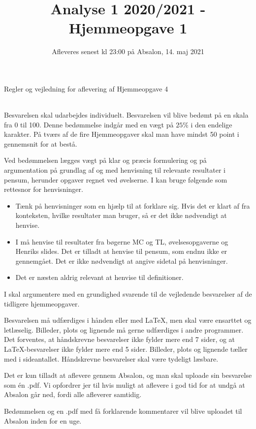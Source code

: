 \documentclass{article}
\title{Analyse 1 2020/2021 - Hjemmeopgave 1}
\author{}
\date{\vspace{-1cm}Afleveres senest kl 23:00 på Absalon, 14. maj 2021}
\begin{document}
	
	\maketitle
	
	\noindent

	
	
	
	\newpage
	\noindent
	{\LARGE Regler og vejledning for aflevering af Hjemmeopgave 4}
	
	\noindent\hrulefill \\
	
	\noindent
	Besvarelsen skal udarbejdes individuelt. Besvarelsen vil blive bedømt på en skala fra 0 til 100. Denne bedømmelse indgår med en vægt på $25\%$ i den endelige karakter. På tværs af de fire Hjemmeopgaver skal man have mindst 50 point i gennemsnit for at bestå.
	
	Ved bedømmelsen lægges vægt på klar og præcis formulering og på argumentation på grundlag af og med henvisning til relevante resultater i pensum, herunder opgaver regnet ved øvelserne. I kan bruge følgende som rettesnor for henvisninger.
	\begin{itemize}
		\item Tænk på henvisninger som en hjælp til at forklare sig. Hvis det er klart af fra konteksten, hvilke resultater man bruger, så er det ikke nødvendigt at henvise.
		
		\item I må henvise til resultater fra bøgerne MC og TL, øvelsesopgaverne og Henriks slides. Det er tilladt at henvise til pensum, som endnu ikke er gennemgået. Det er ikke nødvendigt at angive sidetal på henvisninger. 
		
		\item Det er næsten aldrig relevant at henvise til definitioner.
	\end{itemize}
	I skal argumentere med en grundighed svarende til de vejledende besvarelser af de tidligere hjemmeopgaver.
	
	\bigskip  
	\noindent
	Besvarelsen må udfærdiges i hånden eller med \LaTeX, men skal være ensarttet og letlæselig. Billeder, plots og lignende må gerne udfærdiges i andre programmer. Det forventes, at håndskrevne besvarelser ikke fylder mere end 7 sider,
	og at \LaTeX-besvarelser ikke fylder mere end 5 sider. Billeder, plots og lignende tæller med i sideantallet. Håndskrevne besvarelser skal være tydeligt læsbare.
	
	\bigskip 
	\noindent
	Det er kun tilladt at aflevere gennem Absalon, og man skal uploade sin besvarelse som én .pdf. Vi opfordrer jer til hvis muligt at aflevere i god tid for at undgå at Absalon går ned, fordi alle afleverer samtidig.
	
	\bigskip
	\noindent
	Bedømmelsen og en .pdf med få forklarende kommentarer vil blive uploadet til Absalon inden for en uge.
\end{document}
